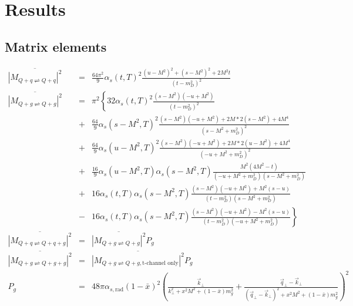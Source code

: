 \documentclass[aps, prc, reprint, amsmath, groupedaddress, nofootinbib]{revtex4-1}
\begin{document}
\section{Results}

\begin{appendices}
\section{Matrix elements}
\label{appendix:matrix-element}
\begin{widetext}
\begin{eqnarray}
\overline{|M_{Q+q\rightleftharpoons Q+q}|^2} &=& \frac{64\pi^2}{9}\alpha_s(t, T)^2 \frac{(u-M^2)^2 + (s-M^2)^2 + 2 M^2 t}{(t-m_D^2)^2}\\
\overline{|M_{Q+g\rightleftharpoons Q+g}|^2} &=& \pi^2 \left\{
32\alpha_s(t,T)^2 \frac{(s-M^2)(-u+M^2)}{(t-m_D^2)^2} \right. \\ \nonumber
&+&\frac{64}{9}\alpha_s(s-M^2, T)^2 \frac{(s-M^2)(-u+M^2)+2M*2(s-M^2) + 4M^4}{(s-M^2+m_D^2)^2} \\ \nonumber
&+&\frac{64}{9}\alpha_s(u-M^2, T)^2 \frac{(s-M^2)(-u+M^2)+2M*2(u-M^2) + 4M^4}{(-u+M^2+m_D^2)^2} \\ \nonumber
&+&\frac{16}{9}\alpha_s(u-M^2, T)\alpha_s(s-M^2, T) \frac{M^2(4M^2 - t)}{(-u+M^2+m_D^2)(s-M^2+m_D^2)} \\ \nonumber
&+& 16 \alpha_s(t, T)\alpha_s(s-M^2, T) \frac{(s-M^2)(-u+M^2)+M^2(s-u)}{(t-m_D^2)(s-M^2+m_D^2)} \\ \nonumber
&-& \left. 16 \alpha_s(t, T)\alpha_s(s-M^2, T) \frac{(s-M^2)(-u+M^2)-M^2(s-u)}{(t-m_D^2)(-u+M^2+m_D^2)}\right\} \\
\overline{|M_{Q+q\rightleftharpoons Q+q+g}|^2} &=& \overline{|M_{Q+g\rightleftharpoons Q+g}|^2} P_g \\
\overline{|M_{Q+g\rightleftharpoons Q+g+g}|^2} &=& \overline{|M_{Q+g\rightleftharpoons Q+g, \textrm{t-channel only}}|^2} P_g \\
P_g &=& 48 \pi \alpha_{s, \textrm{rad}} (1-\bar{x})^2 \left(\frac{\vec{k}_\perp}{k_\perp^2 + x^2 M^2 + (1-\bar{x})m_g^2} 
+ \frac{\vec{q}_\perp - \vec{k}_\perp}{(\vec{q}_\perp-\vec{k}_\perp)^2 + x^2 M^2 + (1-\bar{x})m_g^2}
\right)^2 
\end{eqnarray}
\end{widetext}


\end{appendices}
\end{document}
